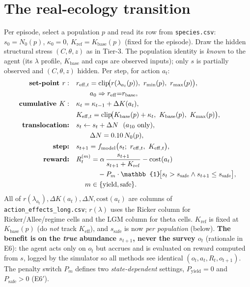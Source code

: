 \documentclass[11pt]{article}
\newcommand{\reff}{r_{\mathrm{eff}}}
\newcommand{\Keff}{K_{\mathrm{eff}}}
\newcommand{\rbase}{r_{\mathrm{base}}}
\newcommand{\Kbase}{K_{\mathrm{base}}}
\newcommand{\Kref}{K_{\mathrm{ref}}}
\newcommand{\rmax}{r_{\max}}
\newcommand{\rmin}{r_{\min}}
\newcommand{\Kmax}{K_{\max}}
\newcommand{\ssafe}{s_{\mathrm{safe}}}
\newcommand{\code}[1]{\texttt{#1}}
\begin{document}
\section{The real-ecology transition}
Per episode, select a population $p$ and read its row from \code{species.csv}:
$s_0{=}N_0(p)$, $\kappa_0{=}0$, $\Kref{=}\Kbase(p)$ (fixed for the episode). Draw the
hidden structural stress $(C,\theta,z)$ as in Tier-3. The population identity is
\emph{known} to the agent (its $\lambda$ profile, $\Kbase$ and caps are observed
inputs); only $s$ is partially observed and $(C,\theta,z)$ hidden. Per step, for
action $a_t$:
\begin{align}
\textbf{set-point }r:\quad
& r_{\mathrm{eff},t}
  =\mathrm{clip}\!\big(r(\lambda_{a_t}(p)),\ \rmin(p),\ \rmax(p)\big), \notag\\
&\qquad a_0\Rightarrow\reff{=}\rbase,\\
\textbf{cumulative }K:\quad
& \kappa_t=\kappa_{t-1}+\Delta K(a_t), \notag\\
& K_{\mathrm{eff},t}
  =\mathrm{clip}\!\big(\Kbase(p)+\kappa_t,\ \Kbase(p),\ \Kmax(p)\big),\\
\textbf{translocation:}\quad
& s_t\leftarrow s_t+\Delta N\ \ (a_{10}\text{ only}), \notag\\
&\qquad \Delta N=0.10\,N_0(p),\\
\textbf{step:}\quad & s_{t+1}=f_{\mathrm{model}}\big(s_t;\ r_{\mathrm{eff},t},\ K_{\mathrm{eff},t}\big),\\
\textbf{reward:}\quad &
\begin{aligned}[t]
R^{(m)}_t
&=\alpha\,\frac{s_{t+1}}{s_{t+1}+\Kref}-\mathrm{cost}(a_t)\\
&\quad -P_m\cdot\mathbb{1}\!\big[
s_t>\ssafe\wedge s_{t+1}\le\ssafe
\big],\\
m&\in\{\mathrm{yield},\mathrm{safe}\}.
\end{aligned}
\end{align}
All of $r(\lambda_{a_t}),\Delta K(a_t),\Delta N,\mathrm{cost}(a_t)$ are columns of
\code{action\_effects\_long.csv}; $r(\lambda)$ uses the Ricker column for
Ricker/Allee/regime cells and the LGM column for theta cells. $\Kref$ is fixed at
$\Kbase(p)$ (do \emph{not} track $\Keff$), and $\ssafe$ is now \emph{per population}
(below). \textbf{The benefit is on the \emph{true} abundance $s_{t+1}$, never the
survey $o_t$} (rationale in E6): the agent acts only on $o_t$ but accrues and is
evaluated on reward computed from $s$, logged by the simulator so all methods see
identical $(o_t,a_t,R_t,o_{t+1})$. The penalty switch $P_m$ defines two
\emph{state-dependent} settings, $P_{\mathrm{yield}}{=}0$ and $P_{\mathrm{safe}}{>}0$
(E6$'$).
\end{document}
